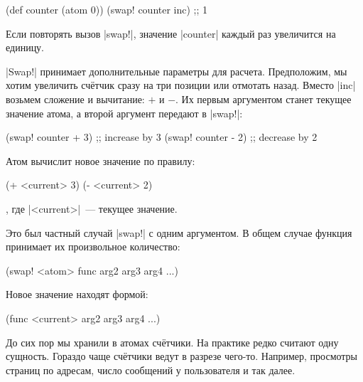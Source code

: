
\begin{english}
  \begin{clojure}
(def counter (atom 0))
(swap! counter inc) ;; 1
  \end{clojure}
\end{english}

Если повторять вызов \spverb|swap!|, значение \spverb|counter| каждый раз
увеличится на единицу.

\spverb|Swap!| принимает дополнительные параметры для расчета. Предположим, мы
хотим увеличить сч\"{е}тчик сразу на три позиции или отмотать назад. Вместо
\spverb|inc| возьмем сложение и вычитание: $+$ и $-$. Их первым аргументом
станет текущее значение атома, а второй аргумент передают в \spverb|swap!|:

\begin{english}
  \begin{clojure}
(swap! counter + 3) ;; increase by 3
(swap! counter - 2) ;; decrease by 2
  \end{clojure}
\end{english}

\noindent
Атом вычислит новое значение по правилу:

\begin{english}
  \begin{clojure}
(+ <current> 3)
(- <current> 2)
  \end{clojure}
\end{english}

\noindent
, где \spverb|<current>|~--- текущее значение.

Это был частный случай \spverb|swap!| с одним аргументом. В общем случае функция
принимает их произвольное количество:

\begin{english}
  \begin{clojure}
(swap! <atom> func arg2 arg3 arg4 ...)
  \end{clojure}
\end{english}

\noindent
Новое значение находят формой:

\begin{english}
  \begin{clojure}
(func <current> arg2 arg3 arg4 ...)
  \end{clojure}
\end{english}

До сих пор мы хранили в атомах сч\"{е}тчики. На практике редко считают одну
сущность. Гораздо чаще сч\"{е}тчики ведут в разрезе чего-то. Например, просмотры
страниц по адресам, число сообщений у пользователя и так далее.

